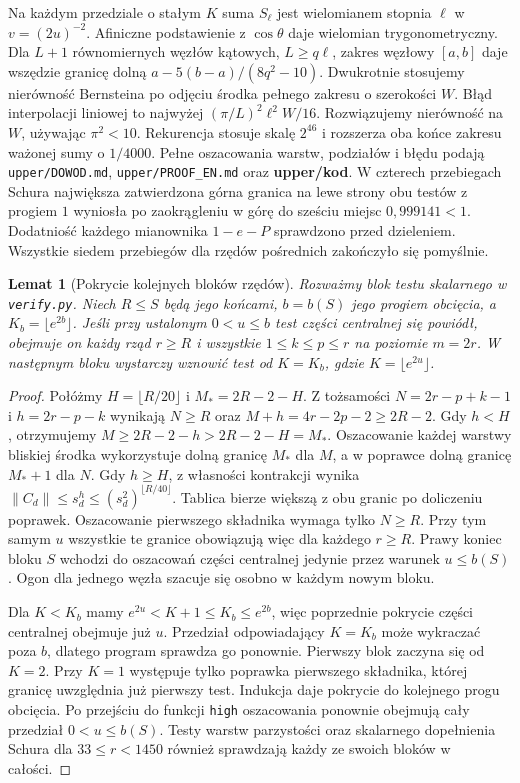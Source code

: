 \documentclass[11pt,a4paper,reqno]{amsart}
\newtheorem{lemma}[theorem]{Lemat}
\numberwithin{equation}{section}
\begin{document}
 Na każdym przedziale o stałym \(K\) suma \(S_\ell\) jest wielomianem stopnia \(\ell\) w \(v=(2u)^{-2}\). Afiniczne podstawienie z \(\cos\theta\) daje wielomian trygonometryczny. Dla \(L+1\) równomiernych węzłów kątowych, \(L\ge q\ell\), zakres węzłowy \([a,b]\) daje wszędzie granicę dolną \(a-5(b-a)/(8q^2-10)\). Dwukrotnie stosujemy nierówność Bernsteina po odjęciu środka pełnego zakresu o szerokości \(W\). Błąd interpolacji liniowej to najwyżej \((\pi/L)^2\ell^2W/16\). Rozwiązujemy nierówność na \(W\), używając \(\pi^2<10\). Rekurencja stosuje skalę \(2^{46}\) i rozszerza oba końce zakresu ważonej sumy o \(1/4000\). Pełne oszacowania warstw, podziałów i błędu podają \texttt{upper/DOWOD.md}, \texttt{upper/PROOF\_EN.md} oraz \textbf{upper/kod}. W czterech przebiegach Schura największa zatwierdzona górna granica na lewe strony obu testów z progiem \(1\) wyniosła po zaokrągleniu w górę do sześciu miejsc \(0{,}999141<1\). Dodatniość każdego mianownika \(1-e-P\) sprawdzono przed dzieleniem. Wszystkie siedem przebiegów dla rzędów pośrednich zakończyło się pomyślnie.

\begin{lemma}[Pokrycie kolejnych bloków rzędów]\label{lem:blocks}
Rozważmy blok testu skalarnego w \texttt{verify.py}. Niech \(R\le S\) będą jego końcami, \(b=b(S)\) jego progiem obcięcia, a \(K_b=\lfloor e^{2b}\rfloor\). Jeśli przy ustalonym \(0<u\le b\) test części centralnej się powiódł, obejmuje on każdy rząd \(r\ge R\) i wszystkie \(1\le k\le p\le r\) na poziomie \(m=2r\). W następnym bloku wystarczy wznowić test od \(K=K_b\), gdzie \(K=\lfloor e^{2u}\rfloor\).
\end{lemma}
\begin{proof}
Połóżmy \(H=\lfloor R/20\rfloor\) i \(M_*=2R-2-H\). Z tożsamości \(N=2r-p+k-1\) i \(h=2r-p-k\) wynikają \(N\ge R\) oraz \(M+h=4r-2p-2\ge2R-2\). Gdy \(h<H\), otrzymujemy \(M\ge 2R-2-h>2R-2-H=M_*\). Oszacowanie każdej warstwy bliskiej środka wykorzystuje dolną granicę \(M_*\) dla \(M\), a w poprawce dolną granicę \(M_*+1\) dla \(N\). Gdy \(h\ge H\), z własności kontrakcji wynika \(\|C_d\|\le s_d^h\le(s_d^2)^{\lfloor R/40\rfloor}\). Tablica bierze większą z obu granic po doliczeniu poprawek. Oszacowanie pierwszego składnika wymaga tylko \(N\ge R\). Przy tym samym \(u\) wszystkie te granice obowiązują więc dla każdego \(r\ge R\). Prawy koniec bloku \(S\) wchodzi do oszacowań części centralnej jedynie przez warunek \(u\le b(S)\). Ogon dla jednego węzła szacuje się osobno w każdym nowym bloku.

Dla \(K<K_b\) mamy \(e^{2u}<K+1\le K_b\le e^{2b}\), więc poprzednie pokrycie części centralnej obejmuje już \(u\). Przedział odpowiadający \(K=K_b\) może wykraczać poza \(b\), dlatego program sprawdza go ponownie. Pierwszy blok zaczyna się od \(K=2\). Przy \(K=1\) występuje tylko poprawka pierwszego składnika, której granicę uwzględnia już pierwszy test. Indukcja daje pokrycie do kolejnego progu obcięcia. Po przejściu do funkcji \texttt{high} oszacowania ponownie obejmują cały przedział \(0<u\le b(S)\). Testy warstw parzystości oraz skalarnego dopełnienia Schura dla \(33\le r<1450\) również sprawdzają każdy ze swoich bloków w całości.
\end{proof}
\end{document}
